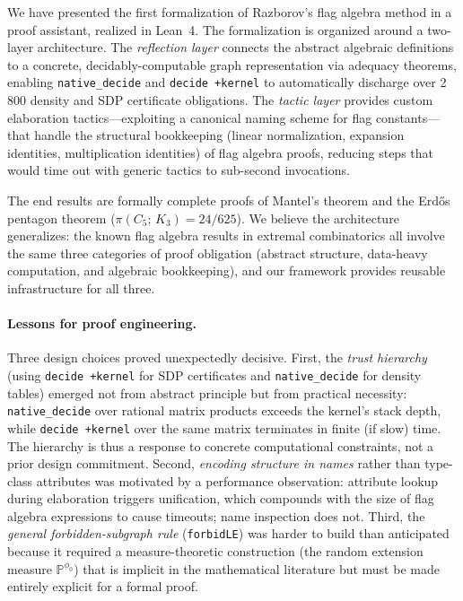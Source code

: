 \documentclass{article}
\newcommand{\tdensity}[2]{\pi(#1;\,#2)}
\newcommand{\lean}[1]{\texttt{#1}}
\begin{document}
We have presented the first formalization of Razborov's flag algebra method in
a proof assistant, realized in Lean~4.  The formalization is organized around
a two-layer architecture.  The \emph{reflection layer} connects the abstract
algebraic definitions to a concrete, decidably-computable graph representation
via adequacy theorems, enabling \lean{native\_decide} and \lean{decide +kernel}
to automatically discharge over 2\,800 density and SDP certificate obligations.
The \emph{tactic layer} provides custom elaboration tactics---exploiting a
canonical naming scheme for flag constants---that handle the structural
bookkeeping (linear normalization, expansion identities, multiplication
identities) of flag algebra proofs, reducing steps that would time out with
generic tactics to sub-second invocations.

The end results are formally complete proofs of Mantel's theorem and the
Erd\H{o}s pentagon theorem ($\tdensity{C_5}{K_3} = 24/625$).  We believe
the architecture generalizes: the known flag algebra results in extremal
combinatorics all involve the same three categories of proof
obligation (abstract structure, data-heavy computation, and algebraic
bookkeeping), and our framework provides reusable infrastructure for all three.

\paragraph{Lessons for proof engineering.}
Three design choices proved unexpectedly decisive.  First, the \emph{trust
hierarchy} (using \lean{decide +kernel} for SDP certificates and \lean{native\_decide}
for density tables) emerged not from abstract principle but from practical
necessity: \lean{native\_decide} over rational matrix products exceeds the
kernel's stack depth, while \lean{decide +kernel} over the same matrix
terminates in finite (if slow) time.  The hierarchy is thus a response to
concrete computational constraints, not a prior design commitment.
Second, \emph{encoding structure in names} rather than type-class attributes
was motivated by a performance observation: attribute lookup during elaboration
triggers unification, which compounds with the size of flag algebra expressions
to cause timeouts; name inspection does not.  Third, the \emph{general
forbidden-subgraph rule} (\lean{forbidLE}) was harder to build than anticipated
because it required a measure-theoretic construction (the random extension
measure $\mathbb{P}^{\phi_0}$) that is implicit in the mathematical literature
but must be made entirely explicit for a formal proof.
\end{document}
